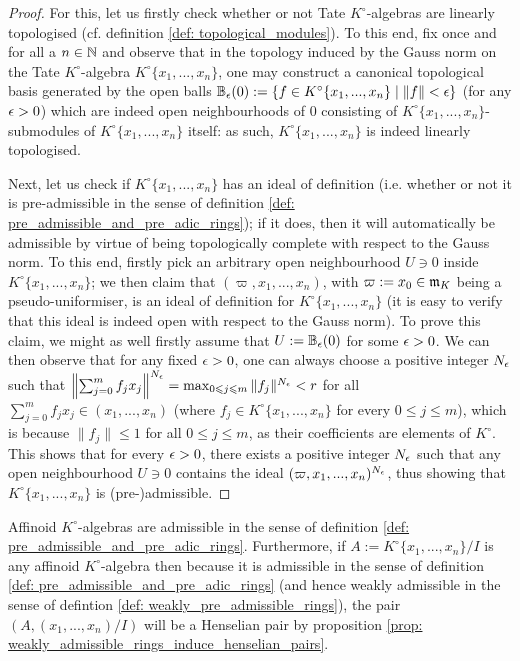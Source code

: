                 \begin{proof}
                    For this, let us firstly check whether or not Tate $K^{\circ}$-algebras are linearly topologised (cf. definition \ref{def: topological_modules}). To this end, fix once and for all a $n \in \mathbb{N}$ and observe that in the topology induced by the Gauss norm on the Tate $K^{\circ}$-algebra $K^{\circ}\{x_1, ..., x_n\}$, one may construct a canonical topological basis generated by the open balls $\mathbb{B}_{\epsilon}(0) := \{f \in K^{\circ}\{x_1, ..., x_n\} \mid \|f\| < \epsilon\}$ (for any $\epsilon > 0$) which are indeed open neighbourhoods of $0$ consisting of $K^{\circ}\{x_1, ..., x_n\}$-submodules of $K^{\circ}\{x_1, ..., x_n\}$ itself: as such, $K^{\circ}\{x_1, ..., x_n\}$ is indeed linearly topologised. 
                
                    Next, let us check if $K^{\circ}\{x_1, ..., x_n\}$ has an ideal of definition (i.e. whether or not it is pre-admissible in the sense of definition \ref{def: pre_admissible_and_pre_adic_rings}); if it does, then it will automatically be admissible by virtue of being topologically complete with respect to the Gauss norm.  To this end, firstly pick an arbitrary open neighbourhood $U \ni 0$ inside $K^{\circ}\{x_1, ..., x_n\}$; we then claim that $(\varpi, x_1, ..., x_n)$, with $\varpi := x_0 \in \mathfrak{m}_K$ being a pseudo-uniformiser, is an ideal of definition for $K^{\circ}\{x_1, ..., x_n\}$ (it is easy to verify that this ideal is indeed open with respect to the Gauss norm). To prove this claim, we might as well firstly assume that $U := \mathbb{B}_{\epsilon}(0)$ for some $\epsilon > 0$. We can then observe that for any fixed $\epsilon > 0$, one can always choose a positive integer $N_{\epsilon}$ such that $\left\| \sum_{j = 0}^m f_j x_j \right\|^{N_{\epsilon}} = \max_{0 \leqslant j \leqslant m} \|f_j\|^{N_{\epsilon}} < r$ for all $\sum_{j = 0}^m f_j x_j \in (x_1, ..., x_n)$ (where $f_j \in K^{\circ}\{x_1, ..., x_n\}$ for every $0 \leq j \leq m$), which is because $\|f_j\| \leq 1$ for all $0 \leq j \leq m$, as their coefficients are elements of $K^{\circ}$. This shows that for every $\epsilon > 0$, there exists a positive integer $N_{\epsilon}$ such that any open neighbourhood $U \ni 0$ contains the ideal $(\varpi, x_1, ..., x_n)^{N_{\epsilon}}$, thus showing that $K^{\circ}\{x_1, ..., x_n\}$ is (pre-)admissible. 
                \end{proof}
            \begin{corollary} \label{coro: affinoid_algebras_over_valuation_rings_are_topologically_pre_admissible}
                Affinoid $K^{\circ}$-algebras are admissible in the sense of definition \ref{def: pre_admissible_and_pre_adic_rings}. Furthermore, if $A := K^{\circ}\{x_1, ..., x_n\}/I$ is any affinoid $K^{\circ}$-algebra then because it is admissible in the sense of definition \ref{def: pre_admissible_and_pre_adic_rings} (and hence weakly admissible in the sense of defintion \ref{def: weakly_pre_admissible_rings}), the pair $(A, (x_1, ..., x_n)/I)$ will be a Henselian pair by proposition \ref{prop: weakly_admissible_rings_induce_henselian_pairs}.
            \end{corollary}
